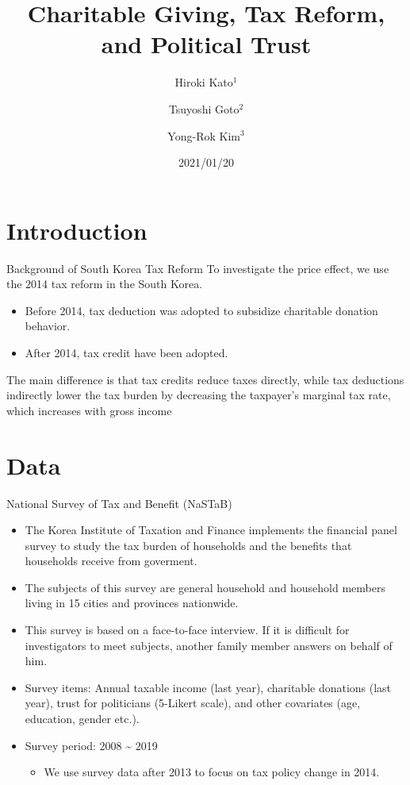 \documentclass[
  ignorenonframetext,
]{beamer}
\title{Charitable Giving, Tax Reform, and Political Trust}
\author{Hiroki Kato\(^1\) \and Tsuyoshi Goto\(^2\) \and Yong-Rok
Kim\(^3\)}
\date{2021/01/20}
\institute{\(^1\)Osaka University \and \(^2\)Chiba
University \and \(^3\)Kobe University}
\providecommand{\tightlist}{%
  \setlength{\itemsep}{0pt}\setlength{\parskip}{0pt}}
\begin{document}
\frame{\titlepage}

\hypertarget{introduction}{%
\section{Introduction}\label{introduction}}

\begin{frame}{Background of South Korea Tax Reform}
\protect\hypertarget{background-of-south-korea-tax-reform}{}
To investigate the price effect, we use the 2014 tax reform in the South
Korea.

\begin{itemize}
\tightlist
\item
  Before 2014, tax deduction was adopted to subsidize charitable
  donation behavior.
\item
  After 2014, tax credit have been adopted.
\end{itemize}

The main difference is that tax credits reduce taxes directly, while tax
deductions indirectly lower the tax burden by decreasing the taxpayer's
marginal tax rate, which increases with gross income
\end{frame}

\hypertarget{data}{%
\section{Data}\label{data}}

\begin{frame}{National Survey of Tax and Benefit (NaSTaB)}
\protect\hypertarget{national-survey-of-tax-and-benefit-nastab}{}
\begin{itemize}
\tightlist
\item
  The Korea Institute of Taxation and Finance implements the financial
  panel survey to study the tax burden of households and the benefits
  that households receive from goverment.
\item
  The subjects of this survey are general household and household
  members living in 15 cities and provinces nationwide.
\item
  This survey is based on a face-to-face interview. If it is difficult
  for investigators to meet subjects, another family member answers on
  behalf of him.
\item
  Survey items: Annual taxable income (last year), charitable donations
  (last year), trust for politicians (5-Likert scale), and other
  covariates (age, education, gender etc.).
\item
  Survey period: 2008 \textasciitilde{} 2019

  \begin{itemize}
  \tightlist
  \item
    We use survey data after 2013 to focus on tax policy change in 2014.
  \end{itemize}
\end{itemize}
\end{frame}
\end{document}
